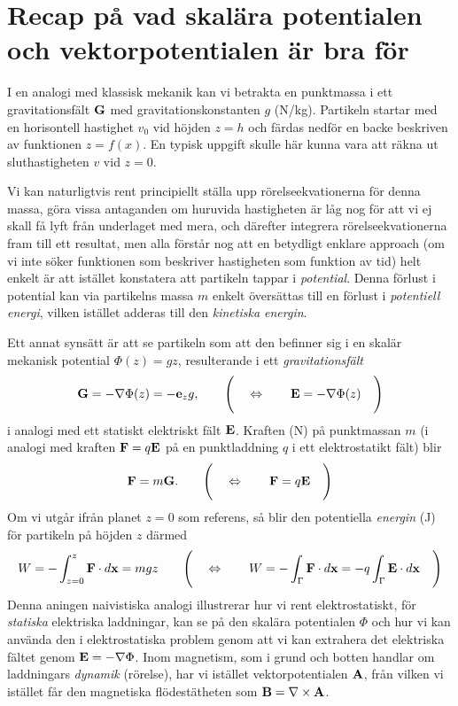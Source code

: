 \section{Recap p{\aa} vad skal{\"a}ra potentialen och vektorpotentialen
         {\"a}r bra f{\"o}r}
I en analogi med klassisk mekanik kan vi betrakta en punktmassa i ett
gravitationsf{\"a}lt ${\bf G}$ med gravitationskonstanten $g$ (N/kg).
Partikeln startar med en horisontell hastighet $v_0$ vid h{\"o}jden $z=h$
och f{\"a}rdas nedf{\"o}r en backe beskriven av funktionen $z=f(x)$.
En typisk uppgift skulle h{\"a}r kunna vara att r{\"a}kna ut sluthastigheten
$v$ vid $z=0$.
\smallskip\centerline{}
\medskip
\noindent
Vi kan naturligtvis rent principiellt st{\"a}lla upp r{\"o}relseekvationerna
f{\"o}r denna massa, g{\"o}ra vissa antaganden om huruvida hastigheten {\"a}r
l{\aa}g nog f{\"o}r att vi ej skall f{\aa} lyft fr{\aa}n underlaget med mera,
och d{\"a}refter integrera r{\"o}relseekvationerna fram till ett resultat, men
alla f{\"o}rst{\aa}r nog att en betydligt enklare approach (om vi inte s{\"o}ker
funktionen som beskriver hastigheten som funktion av tid) helt enkelt {\"a}r
att ist{\"a}llet konstatera att partikeln tappar i {\it potential}. Denna
f{\"o}rlust i potential kan via partikelns massa $m$ enkelt {\"o}vers{\"a}ttas
till en f{\"o}rlust i {\it potentiell energi}, vilken ist{\"a}llet adderas till
den {\it kinetiska energin}.

Ett annat syns{\"a}tt {\"a}r att se partikeln som att den befinner sig i en
skal{\"a}r mekanisk potential $\Phi(z)=gz$, resulterande i ett
{\it gravitationsf{\"a}lt}
$$
  {\bf G}=-\nabla\Phi(z)=-{\bf e}_z g,
  \qquad\Bigg(\quad\Leftrightarrow\qquad
  {\bf E}=-\nabla\Phi(z)
  \quad\Bigg)
$$
i analogi med ett statiskt elektriskt f{\"a}lt ${\bf E}$. Kraften (N) p{\aa}
punktmassan $m$ (i analogi med kraften ${\bf F}=q{\bf E}$ p{\aa} en
punkt\-laddning $q$ i ett elektrostatikt f{\"a}lt) blir
$$
  {\bf F}=m{\bf G}.
  \qquad\Bigg(\quad\Leftrightarrow\qquad
  {\bf F}=q{\bf E}
  \quad\Bigg)
$$
Om vi utg{\aa}r ifr{\aa}n planet $z=0$ som referens, s{\aa} blir den
potentiella {\it energin} (J) f{\"o}r partikeln p{\aa} h{\"o}jden $z$
d{\"a}rmed
$$
  W = -\int^z_{z=0}{\bf F}\cdot d{\bf x} = mgz
  \qquad\Bigg(\quad\Leftrightarrow\qquad
  W = -\int_{\Gamma}{\bf F}\cdot d{\bf x}
    = -q\int_{\Gamma}{\bf E}\cdot d{\bf x}
  \quad\Bigg)
$$
Denna aningen naivistiska analogi illustrerar hur vi rent elektrostatiskt,
f{\"o}r {\it statiska} elektriska laddningar, kan se p{\aa} den skal{\"a}ra
potentialen $\Phi$ och hur vi kan anv{\"a}nda den i elektrostatiska problem
genom att vi kan extrahera det elektriska f{\"a}ltet genom
${\bf E}=-\nabla\Phi$. Inom magnetism, som i grund och botten handlar om
laddningars {\it dynamik} (r{\"o}relse), har vi ist{\"a}llet vektorpotentialen
${\bf A}$, fr{\aa}n vilken vi ist{\"a}llet f{\aa}r den magnetiska
fl{\"o}dest{\"a}theten som ${\bf B}=\nabla\times{\bf A}$.

